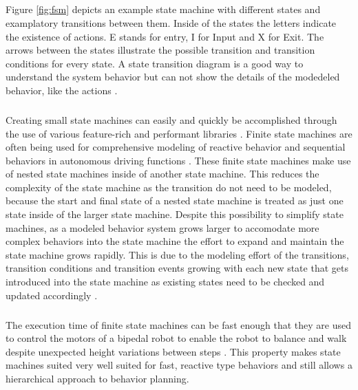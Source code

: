 \subparagraph*{}
Figure \ref{fig:fsm} depicts an example state machine with different states and examplatory transitions between them. Inside of the states the letters indicate the existence of actions.  E stands for entry, I for Input and X for Exit. The arrows between the states illustrate the possible transition and transition conditions for every state. A state transition diagram is a good way to understand the system behavior but can not show the details of the modedeled behavior, like the actions \cite{wagner2006}. 
\subparagraph*{}
Creating small state machines can easily and quickly be accomplished through the use of various feature-rich and performant libraries \cite{fourakis2014}. 
Finite state machines are often being used for comprehensive modeling of reactive behavior and sequential behaviors in autonomous driving functions \cite{ziegler2014}. These finite state machines make use of nested state machines inside of another state machine. This reduces the complexity of the state machine as the transition do not need to be modeled, because the start and final state of a nested state machine is treated as just one state inside of the larger state machine. Despite this possibility to simplify state machines, as a modeled behavior system grows larger to accomodate more complex behaviors into the state machine the effort to expand and maintain the state machine grows rapidly. This is due to the modeling effort of the transitions, transition conditions and transition events growing with each new state that gets introduced into the state machine as existing states need to be checked and updated accordingly \cite{conner2017}. 
\subparagraph*{}
The execution time of finite state machines can be fast enough that they are used to control the motors of a bipedal robot to enable the robot to balance and walk despite unexpected height variations between steps \cite{park2013}. This property makes state machines suited very well suited for fast, reactive type behaviors and still allows a hierarchical approach to behavior planning.


%

